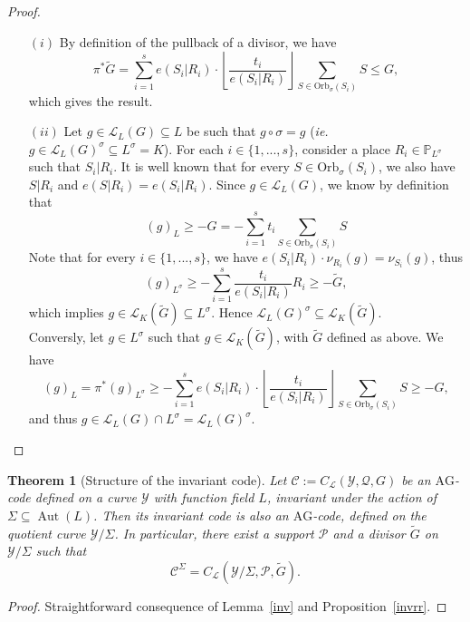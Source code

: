 \documentclass[10pt]{article}
\newtheorem{thm}{Theorem}
\theoremstyle{definition}
\theoremstyle{definition}
\theoremstyle{definition}
\newcommand{\cd}{\cdot}
\newcommand{\PP}{\mathbb{P}}
\newcommand{\su}{\subseteq}
\newcommand{\Y}{\mathcal{Y}}
\newcommand{\PR}{\mathcal{P}}
\newcommand{\QR}{\mathcal{Q}}
\newcommand{\Aut}{\operatorname{Aut}}
\newcommand{\calL}{\mathcal{L}}
\begin{document}
\begin{proof}
\begin{itemize}
\item[$(i)$] By definition of the pullback of a divisor, we have
\[\pi^*\tilde{G} = \sum\limits_{i=1}^s e(S_i|R_i) \cd \left\lfloor\dfrac{t_i}{e(S_i|R_i)}\right\rfloor \sum\limits_{S \in \mathrm{Orb}_{\sigma}(S_i)} S \leq G,\]
which gives the result. 
\item[$(ii)$] Let $g \in \calL_L(G) \su L$ be such that $g \circ \sigma = g$ (\textit{ie.} $g \in \calL_L(G)^{\sigma} \su L^{\sigma}=K$). For each $i \in \{1,...,s\}$, consider a place $R_i \in \PP_{L^{\sigma}}$ such that $S_i|R_i$. It is well known that for every $S \in \mathrm{Orb}_{\sigma}(S_i)$, we also have $S|R_i$ and $e(S|R_i)=e(S_i|R_i)$. Since $g \in \calL_L(G)$, we know by definition that
\[(g)_L \geq -G=- \sum\limits_{i=1}^s t_i \sum\limits_{S \in \mathrm{Orb}_{\sigma}(S_i)} S\]
Note that for every $i \in \{1,...,s\}$, we have $e(S_i|R_i) \cd \nu_{R_i}(g) = \nu_{S_i}(g)$, thus
\[(g)_{L^{\sigma}} \geq - \sum\limits_{i=1}^s \dfrac{t_i}{e(S_i|R_i)}  R_i \geq - \tilde{G},\]
which implies $g \in \calL_K(\tilde{G}) \su L^{\sigma}$. Hence $\calL_L(G)^{\sigma} \su \calL_K(\tilde{G})$. \\
Conversly, let $g \in L^{\sigma}$ such that $g \in \calL_K(\tilde{G})$, with $\tilde{G}$ defined as above. We have 
\[ (g)_L = \pi^*(g)_{L^{\sigma}} \geq -\sum\limits_{i=1}^s e(S_i|R_i) \cd \left\lfloor\dfrac{t_i}{e(S_i|R_i)}\right\rfloor \sum\limits_{S \in \mathrm{Orb}_{\sigma}(S_i)} S \geq -G,\]
and thus $g \in \calL_L(G) \cap L^{\sigma} = \calL_L(G)^{\sigma}$.
\end{itemize}
\end{proof}
\color{black}

\begin{thm} [Structure of the invariant code] \label{invstruct}
Let $\mathcal{C} := C_{\calL}(\Y,\QR,G)$ be an $\mathrm{AG}$-code defined on a curve $\Y$ with function field $L$, invariant under the action of $\Sigma \su \Aut(L)$. Then its invariant code is also an $\mathrm{AG}$-code, defined on the quotient curve $\Y/\Sigma$. In particular, there exist a support $\PR$ and a divisor $\tilde{G}$ on $\Y/\Sigma$ such that
\[\mathcal{C}^{\Sigma} = C_{\calL}(\Y/\Sigma,\PR,\tilde{G}).\]
\end{thm}

\begin{proof}
Straightforward consequence of Lemma~\ref{inv} and Proposition~\ref{invrr}.
\end{proof}
\end{document}
